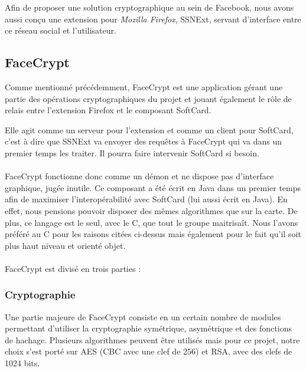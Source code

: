 \documentclass[a4paper,11pt,french]{article}
\begin{document}
Afin de proposer une solution cryptographique au sein de Facebook, nous avons 
aussi conçu une extension pour \emph{Mozilla Firefox}, SSNExt, servant 
d'interface entre ce réseau social et l'utilisateur.

\subsection{FaceCrypt}
Comme mentionné précédemment, FaceCrypt est une application gérant une partie
des opérations cryptographiques du projet et jouant également le rôle de
relais entre l'extension Firefox et le composant SoftCard. 

Elle agit comme un serveur pour l'extension et comme un client pour SoftCard, 
c'est à dire que SSNExt va envoyer des requêtes à FaceCrypt qui va dans un 
premier temps les traiter. Il pourra faire intervenir SoftCard si besoin.

\paragraph{}
FaceCrypt fonctionne donc comme un démon et ne dispose pas d'interface
graphique, jugée inutile. Ce composant a été écrit en Java dans un premier 
temps afin de maximiser l'interopérabilité avec SoftCard (lui aussi écrit en 
Java). En effet, nous pensions pouvoir disposer des mêmes algorithmes 
que sur la carte. De plus, ce langage est le seul, avec le C, que tout le
groupe maitrisaît. Nous l'avons préféré au C pour les raisons citées ci-dessus
mais également pour le fait qu'il soit plus haut niveau et orienté objet.

\paragraph{}
FaceCrypt est divisé en trois parties : 

\subsubsection{Cryptographie}
Une partie majeure de FaceCrypt consiste en un certain nombre de modules 
permettant d'utiliser la cryptographie symétrique, asymétrique et des 
fonctions de hachage. Plusieurs algorithmes peuvent être utilisés mais
pour ce projet, notre choix s'est porté sur AES (CBC avec une clef de 256) et 
RSA, avec des clefs de 1024 bits.
\end{document}
